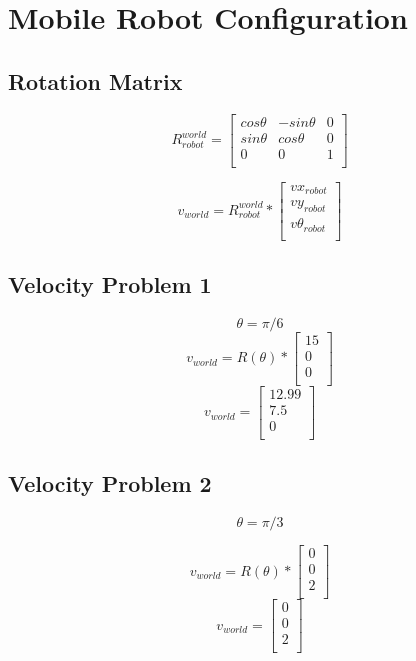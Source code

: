 \section{Mobile Robot Configuration}
\subsection{Rotation Matrix}
$$ R_{robot}^{world} = 
\begin{bmatrix} 
cos\theta & -sin\theta & 0 \\
sin\theta & cos\theta & 0 \\
0 & 0 & 1 \\
\end{bmatrix}
$$

$$ v_{world} = R_{robot}^{world}* 
\begin{bmatrix} 
vx _{robot}\\
vy_{robot} \\
v\theta_{robot} \\
\end{bmatrix}
$$
\subsection{Velocity Problem 1}
$$ 
\theta = \pi/6
$$
$$
v_{world} = R(\theta)* 
\begin{bmatrix} 
15 \\
0 \\
0 \\
\end{bmatrix}
$$
$$
v_{world} = 
\begin{bmatrix} 
12.99 \\
7.5 \\
0 \\
\end{bmatrix}
$$

\subsection{Velocity Problem 2}
$$ 
\theta = \pi/3
$$

$$
v_{world} = R(\theta)* 
\begin{bmatrix} 
0 \\
0 \\
2 \\
\end{bmatrix}
$$
$$
v_{world} = 
\begin{bmatrix} 
0 \\
0 \\
2 \\
\end{bmatrix}
$$

